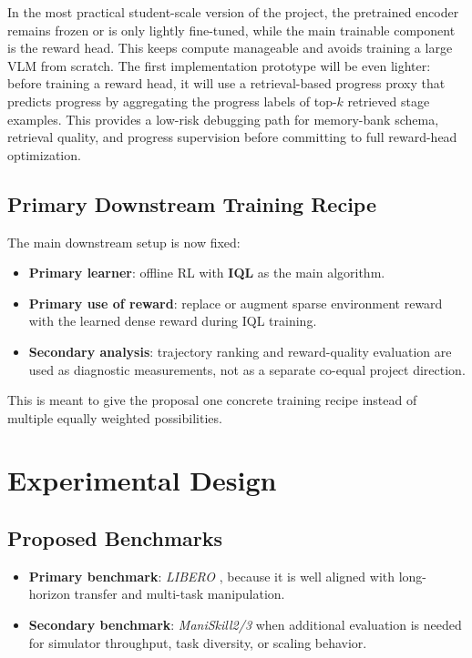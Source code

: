 In the most practical student-scale version of the project, the pretrained encoder remains frozen
or is only lightly fine-tuned, while the main trainable component is the reward head.
This keeps compute manageable and avoids training a large VLM from scratch.
The first implementation prototype will be even lighter:
before training a reward head, it will use a retrieval-based progress proxy that predicts progress
by aggregating the progress labels of top-$k$ retrieved stage examples.
This provides a low-risk debugging path for memory-bank schema, retrieval quality, and progress supervision
before committing to full reward-head optimization.

\subsection{Primary Downstream Training Recipe}

The main downstream setup is now fixed:
\begin{itemize}
  \item \textbf{Primary learner}: offline RL with \textbf{IQL} as the main algorithm.
  \item \textbf{Primary use of reward}: replace or augment sparse environment reward with the learned dense reward during IQL training.
  \item \textbf{Secondary analysis}: trajectory ranking and reward-quality evaluation are used as diagnostic measurements, not as a separate co-equal project direction.
\end{itemize}

This is meant to give the proposal one concrete training recipe instead of multiple equally weighted possibilities.

\section{Experimental Design}

\subsection{Proposed Benchmarks}

\begin{itemize}
  \item \textbf{Primary benchmark}: \textit{LIBERO} \citep{liu2023libero}, because it is well aligned with long-horizon transfer and multi-task manipulation.
  \item \textbf{Secondary benchmark}: \textit{ManiSkill2/3} \citep{gu2022maniskill2, tao2024maniskill3} when additional evaluation is needed for simulator throughput, task diversity, or scaling behavior.
\end{itemize}

